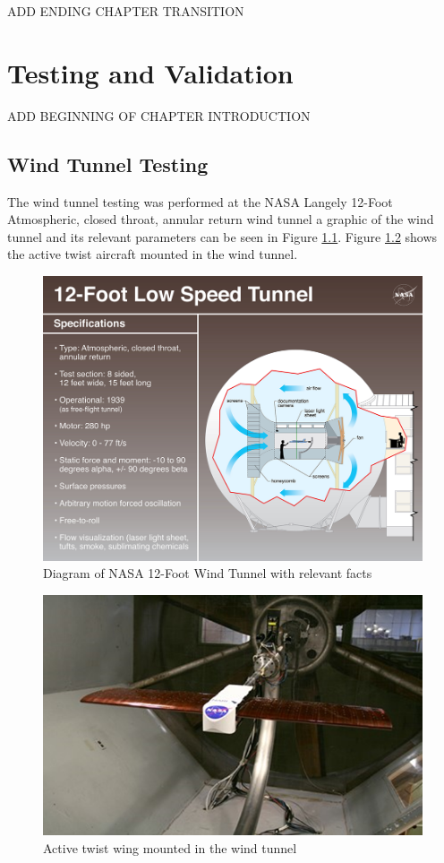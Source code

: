 \documentclass[11pt]{ucthesis}
\begin{document}
{\color{red} ADD ENDING CHAPTER TRANSITION}

\chapter{Testing and Validation}
{\color{red} ADD BEGINNING OF CHAPTER INTRODUCTION}
\section{Wind Tunnel Testing}
The wind tunnel testing was performed at the NASA Langely 12-Foot Atmospheric, closed throat, annular return wind tunnel a graphic of the wind tunnel and its relevant parameters can be seen in Figure \ref{fig:windTunnel}. Figure \ref{fig:flex} shows the active twist aircraft mounted in the wind tunnel.

\begin{figure}[h]
\centering
\includegraphics[width=1\linewidth]{Figures/12FootWindTunnel.png}
\caption{Diagram of NASA 12-Foot Wind Tunnel with relevant facts}
\label{fig:windTunnel}
\end{figure}

\begin{figure}[h]
\centering
\includegraphics[width=1\linewidth]{Figures/wingFlex.png}
\caption{Active twist wing mounted in the wind tunnel}
\label{fig:flex}
\end{figure}
\end{document}
